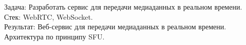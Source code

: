 \item {}
    Задача: Разработать сервис для передачи медиаданных в реальном времени.\\
    Стек: WebRTC, WebSocket.\\
    Результат: Веб-сервис для передачи медиаданных в реальном времени. Архитектура по принципу SFU.
